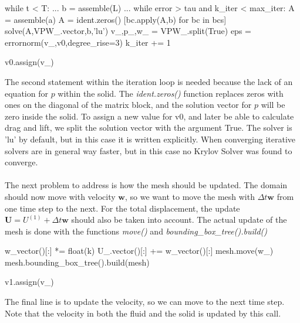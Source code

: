 \begin{cverbatim}
while t < T:
	...
	b = assemble(L)
	...
	while error > tau and k_iter < max_iter:
		A = assemble(a)
		A = ident.zeros()
		[bc.apply(A,b) for bc in bcs]
		solve(A,VPW_.vector,b,'lu')
		v_,p_,w_ = VPW_.split(True)
		eps = errornorm(v_,v0,degree_rise=3)	
		k_iter += 1
		
		v0.assign(v_)
\end{cverbatim}
The second statement within the iteration loop is needed because the lack of an equation for $p$ within the solid. The \textit{ident.zeros()} function replaces zeros with ones on the diagonal of the matrix block, and the solution vector for $p$ will be zero inside the solid. To assign a new value for v0, and later be able to calculate drag and lift, we split the solution vector with the argument True. The solver is 'lu' by default, but in this case it is written explicitly. When converging iterative solvers are in general way faster, but in this case no Krylov Solver was found to converge. 
\\
\\
The next problem to address is how the mesh should be updated. The domain should now move with velocity $\mathbf{w}$, so we want to move the mesh with $\Delta t \mathbf{w}$ from one time step to the next. For the total displacement, the update $\mathbf{U} = U^{(1)} + \Delta t \mathbf{w}$ should also be taken into account. The actual update of the mesh is done with the functions \textit{move()} and \textit{bounding\_box\_tree().build()}
\begin{cverbatim}
	w_vector()[:] *= float(k)
	U_.vector()[:] += w_vector()[:]
	mesh.move(w_)
	mesh.bounding_box_tree().build(mesh)
	
	v1.assign(v_)
\end{cverbatim}
The final line is to update the velocity, so we can move to the next time step. Note that the velocity in both the fluid and the solid is updated by this call. \\

	
	
	


